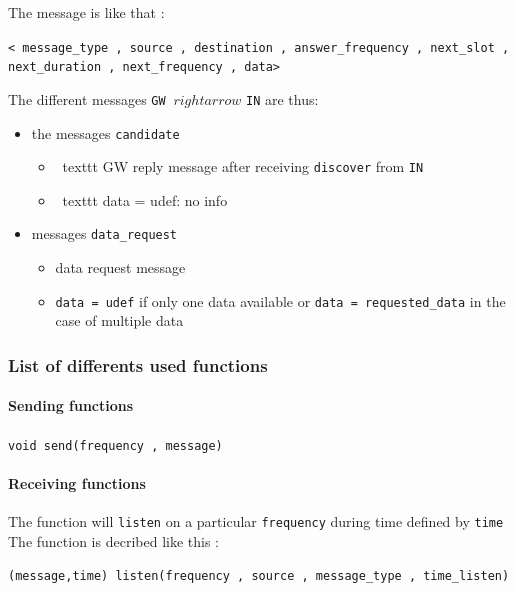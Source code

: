 \documentclass[conference]{IEEEtran}
\begin{document}
The message is like that   :

\begin{center}
\texttt{< message\_type , source , destination , answer\_frequency , next\_slot , next\_duration , next\_frequency , data>}
\end{center}

The different messages \texttt {GW} $ \ rightarrow $ \texttt {IN} are thus:
\begin{itemize}
     \item the messages \texttt {candidate} 
     \begin {itemize}
       \item \ texttt {GW} reply message after receiving \texttt{discover} from \texttt{IN}
       \item \ texttt {data = udef}: no info
     \end{itemize}
     \item messages \texttt{data\_request}
     \begin{itemize}
       \item data request message
       \item \texttt{data = udef} if only one data available or \texttt{data = requested\_data} in the case of multiple data
     \end{itemize}
\end {itemize}

\subsubsection{List of differents used functions}

\paragraph{Sending functions}

\texttt{void send(frequency , message)}

\paragraph{Receiving functions}

The function will \texttt{listen}  on a particular \texttt{frequency} during time defined by \texttt{time} The function is decribed like this :

\begin{center}
\texttt{(message,time) listen(frequency , source , message\_type , time\_listen)}
\end{center}
\end{document}
